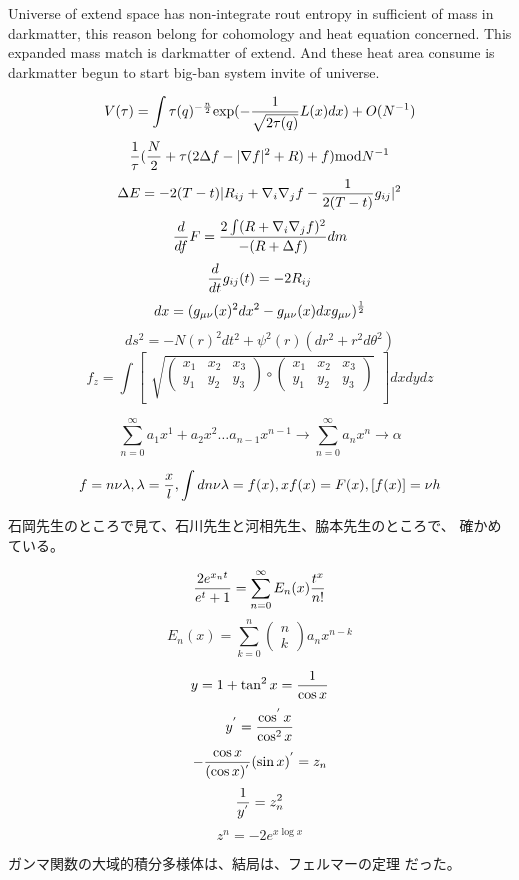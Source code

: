 \documentclass{jsarticle}
\begin{document}
  Universe of extend space has non-integrate rout entropy in sufficient of mass in darkmatter,
this reason belong for cohomology and heat equation concerned. This expanded mass match is darkmatter
of extend. And these heat area consume is darkmatter begun to start big-ban system invite of universe.

$$ V(\tau) = \int \tau(q)^{-{n \over 2}} \mathrm{exp}(-{1 \over \sqrt{2 \tau(q)}}L(x)dx) + O(N^{-1}) $$
$$ {1 \over \tau}({N \over 2} + \tau(2 \Delta f - |\nabla f|^2 + R) + f)\mathrm{mod}N^{-1} $$
	$$ \Delta E = -2(T - t)|R_{ij} + \nabla_{i} \nabla_{j} f - {1 \over 2(T - t)}g_{ij}|^2 $$
	$$ {d \over df}F = {2\int (R + \nabla_{i} \nabla_{j} f)^2 \over - (R + \Delta f)}dm $$
	$$ {d \over dt}g_{ij}(t) = - 2 R_{ij} $$
	$$ dx = (g_{\mu\nu}(x)^2dx^2 - g_{\mu\nu}(x)dxg_{\mu\nu})^{1 \over 2} $$
	$$ ds^2 = - N(r)^2dt^2 + \psi^2(r)(dr^2 + r^2d\theta^2) $$
  $$ f_{z} = \int \begin{bmatrix} \sqrt{\begin{pmatrix} x_{1} & x_{2} & x_{3} \\
     y_{1} & y_{2} & y_{3} \end{pmatrix}
     \circ
   \begin{pmatrix} x_{1} & x_{2} & x_{3} \\
     y_{1} & y_{2} & y_{3} \end{pmatrix}}_{}
     \end{bmatrix}dxdydz $$

     $$ \sum^{\infty}_{n=0}a_1x^1 + a_2x^2 \dots a_{n-1}x^{n-1} \to \sum^{\infty}_{n=0} a_nx^n \to \alpha $$

$$ f = n\nu\lambda , \lambda = {x \over l},
 \int dn \nu \lambda = f(x), 
 xf(x) = F(x),
 [f(x)] = \nu h$$


    石岡先生のところで見て、石川先生と河相先生、脇本先生のところで、
    確かめている。

    $$ {2 e^{x_n t} \over {e^{t} + 1}} = \sum_{n=0}^{\infty} E_n(x){{t^x} 
    \over {n!}} $$
    $$ E_n(x) = \sum_{k=0}^{n} \begin{pmatrix} n \\
    k\end{pmatrix}  a_n x^{n -k} $$

	   $$ y =  1 + \tan^2 x = {1 \over {\cos x}} $$
	   $$ y^{'} = {{\cos^{'}x} \over {\cos^2 x}} $$
           $$ -{{\cos x} \over (\cos x)^{'}}(\sin x)^{'} = z_n $$
	   $$ {1 \over y^{'}} = z^2_n$$
           $$ z^n = - 2 e^{x \log x} $$

	   ガンマ関数の大域的積分多様体は、結局は、フェルマーの定理
	   だった。
\end{document}
